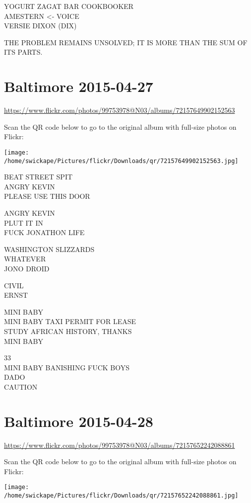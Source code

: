 \documentclass[10pt,letterpaper]{article}
\begin{document}
YOGURT ZAGAT BAR COOKBOOKER\\
AMESTERN <{-} VOICE\\
VERSIE DIXON (DIX)

THE PROBLEM REMAINS UNSOLVED; IT IS MORE THAN THE SUM OF ITS PARTS.
\pagebreak

\section*{Baltimore 2015-04-27}

\url{https://www.flickr.com/photos/99753978@N03/albums/72157649902152563}

Scan the QR code below to go to the original album with full-size photos on Flickr:

\texttt{[image: /home/swickape/Pictures/flickr/Downloads/qr/72157649902152563.jpg]}
\pagebreak

BEAT STREET SPIT\\
ANGRY KEVIN\\
PLEASE USE THIS DOOR

ANGRY KEVIN\\
PLUT IT IN\\
FUCK JONATHON LIFE

WASHINGTON SLIZZARDS\\
WHATEVER\\
JONO DROID

CIVIL\\
ERNST

MINI BABY\\
MINI BABY TAXI PERMIT FOR LEASE\\
STUDY AFRICAN HISTORY, THANKS\\
MINI BABY

33\\
MINI BABY BANISHING FUCK BOYS\\
DADO\\
CAUTION
\pagebreak

\section*{Baltimore 2015-04-28}

\url{https://www.flickr.com/photos/99753978@N03/albums/72157652242088861}

Scan the QR code below to go to the original album with full-size photos on Flickr:

\texttt{[image: /home/swickape/Pictures/flickr/Downloads/qr/72157652242088861.jpg]}
\pagebreak
\end{document}
